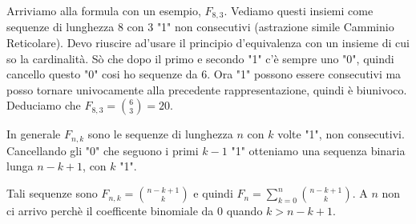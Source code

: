 Arriviamo alla formula con un esempio, $F_{8,3}$. Vediamo questi insiemi come sequenze di lunghezza 8 con 3 "1" non consecutivi (astrazione simile Camminio Reticolare). Devo riuscire ad'usare il principio d'equivalenza con un insieme di cui so la cardinalità. Sò che dopo il primo e secondo "1" c'è sempre uno "0", quindi cancello questo "0" cosi ho sequenze da 6.
Ora "1" possono essere consecutivi ma posso tornare univocamente alla precedente rappresentazione, quindi è biunivoco.
Deduciamo che $F_{8,3}=\binom{6}{3}=20$.

In generale $F_{n,k}$ sono le sequenze di lunghezza $n$ con $k$ volte "1", non consecutivi. Cancellando gli "0" che seguono i primi $k-1$ "1" otteniamo una sequenza binaria lunga $n-k+1$, con $k$ "1".

Tali sequenze sono $F_{n,k}=\binom{n-k+1}{k}$ e quindi $F_n=\sum_{k=0}^n\binom{n-k+1}{k}$.
A $n$ non ci arrivo perchè il coefficente binomiale da 0 quando $k>n-k+1$.